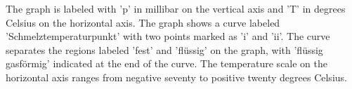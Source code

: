 The graph is labeled with 'p' in millibar on the vertical axis and 'T' in degrees Celsius on the horizontal axis. The graph shows a curve labeled 'Schmelztemperaturpunkt' with two points marked as 'i' and 'ii'. The curve separates the regions labeled 'fest' and 'flüssig' on the graph, with 'flüssig gasförmig' indicated at the end of the curve. The temperature scale on the horizontal axis ranges from negative seventy to positive twenty degrees Celsius.